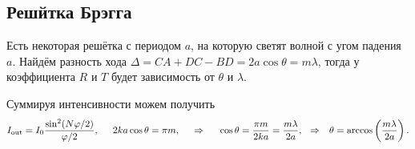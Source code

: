 \subsection{Решйтка Брэгга}


Есть некоторая решётка с периодом $a$, на которую светят волной с угом падения $a$. 
Найдём разность хода $\Delta = CA+DC-BD = 2 a \cos \theta = m \lambda$, тогда у коэффициента $R$ и $T$ будет зависимость от $\theta$ и $\lambda$.

Суммируя интенсивности можем получить
\begin{equation*}
    I_{\text{out}} = I_0 \frac{\sin^2 (N \varphi/2)}{\varphi/2},
    \hspace{5 mm} 
    2 k a \cos \theta = \pi m,
    \hspace{0.5cm} \Rightarrow \hspace{0.5cm}
    \cos \theta =  \frac{\pi m }{2 k a}
    = \frac{m \lambda}{2 a},
    \hspace{0.25cm} \Rightarrow \hspace{0.25cm}
    \theta = \arccos\left(\frac{m \lambda}{2a}\right).
\end{equation*}


